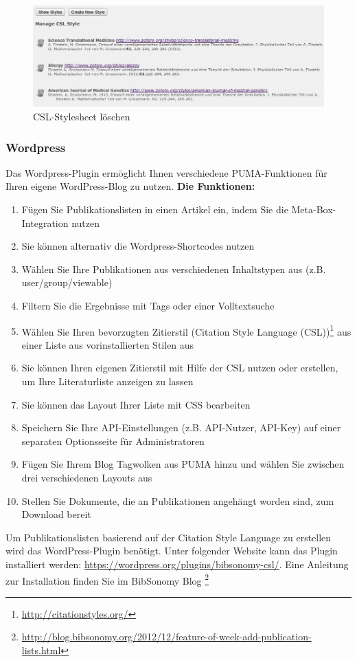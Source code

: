 \begin{figure}[ht]
 \centering
 \includegraphics[scale=0.4]{puma-103}
 \caption{CSL-Stylesheet löschen}
 \label{figure1}
\end{figure}




\subsubsection{Wordpress}
Das Wordpress-Plugin ermöglicht Ihnen verschiedene PUMA-Funktionen für Ihren eigene WordPress-Blog zu nutzen.\newline\newline
\textbf{Die Funktionen:}
\begin{enumerate}
   \item Fügen Sie Publikationslisten in einen Artikel ein, indem Sie die Meta-Box-Integration nutzen
    \item Sie können alternativ die Wordpress-Shortcodes nutzen
    \item Wählen Sie Ihre Publikationen aus verschiedenen Inhaltstypen aus (z.B. user/group/viewable)
    \item Filtern Sie die Ergebnisse mit Tags oder einer Volltextsuche
    \item Wählen Sie Ihren bevorzugten Zitierstil (Citation Style Language (CSL))\footnote{\url{ http://citationstyles.org/}}  aus einer Liste aus vorinstallierten Stilen aus
    \item Sie können Ihren eigenen Zitierstil mit Hilfe der CSL nutzen oder erstellen, um Ihre Literaturliste anzeigen zu lassen
    \item Sie können das Layout Ihrer Liste mit CSS bearbeiten
    \item Speichern Sie Ihre API-Einstellungen (z.B. API-Nutzer, API-Key) auf einer separaten Optionsseite für Administratoren
    \item Fügen Sie Ihrem Blog Tagwolken aus PUMA hinzu und wählen Sie zwischen drei verschiedenen Layouts aus
    \item Stellen Sie Dokumente, die an Publikationen angehängt worden sind, zum Download bereit
\end{enumerate} 
Um Publikationslisten basierend auf der Citation Style Language zu erstellen wird das WordPress-Plugin benötigt. Unter folgender Website kann das Plugin installiert werden: \url{https://wordpress.org/plugins/bibsonomy-csl/}. Eine Anleitung zur Installation finden Sie im BibSonomy Blog \footnote{\url{http://blog.bibsonomy.org/2012/12/feature-of-week-add-publication-lists.html}}

